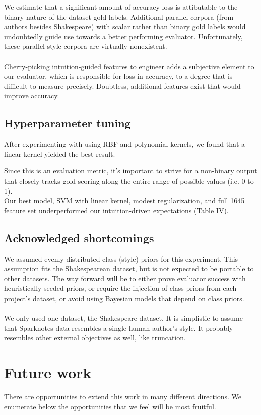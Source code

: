 \documentclass[letterpaper, 10 pt, conference]{ieeeconf}  %
\begin{document}
  We estimate that a significant amount of accuracy loss is attibutable to the binary nature of the dataset gold labels. Additional parallel corpora (from authors besides Shakespeare) with scalar rather than binary gold labels would undoubtedly guide use towards a better performing evaluator. Unfortunately, these parallel style corpora are virtually nonexistent.
  \\
  \\
  Cherry-picking intuition-guided features to engineer adds a subjective element to our evaluator, which is responsible for loss in accuracy, to a degree that is difficult to measure precisely. Doubtless, additional features exist that would improve accuracy.

  \subsection{Hyperparameter tuning}
    After experimenting with using RBF and polynomial kernels, we found that a linear kernel yielded the best result.


    Since this is an evaluation metric, it's important to strive for a non-binary output that closely tracks gold scoring along the entire range of possible values (i.e. 0 to 1).\\
    Our best model, SVM with linear kernel, modest regularization, and full 1645 feature set underperformed our intuition-driven expectations (Table IV).


  \subsection{Acknowledged shortcomings}
  We assumed evenly distributed class (style) priors for this experiment. This assumption fits the Shakespearean dataset, but is not expected to be portable to other datasets. The way forward will be to either prove evaluator success with heuristically seeded priors, or require the injection of class priors from each project's dataset, or avoid using Bayesian models that depend on class priors. \\ \\
  We only used one dataset, the Shakespeare dataset. It is simplistic to assume that Sparknotes data resembles a single human author's style. It probably resembles other external objectives as well, like truncation.


\section{Future work}
There are opportunities to extend this work in many different directions. We enumerate below the opportunities that we feel will be most fruitful. \\
\end{document}
